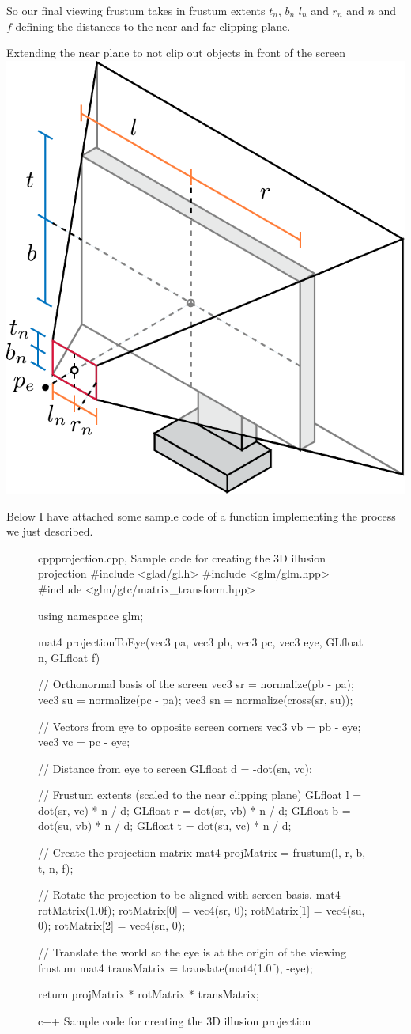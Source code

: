 So our final viewing frustum takes in frustum extents $t_n$, $b_n$ $l_n$ and $r_n$ and $n$ and $f$ defining the distances to the near and far clipping plane.
\begin{figureBox}[label={fig:extending-near}]{Extending the near plane to not clip out objects in front of the screen}
\centering
\includegraphics[width = 0.5\linewidth]{./figures/background/projection/extending-near.pdf}
\end{figureBox}


Below I have attached some sample code of a function implementing the process we just described.
\begin{figure}[H]
\begin{codeBox}{cpp}{projection.cpp, Sample code for creating the 3D illusion projection}
#include <glad/gl.h>
#include <glm/glm.hpp>
#include <glm/gtc/matrix_transform.hpp>

using namespace glm;

mat4 projectionToEye(vec3 pa, vec3 pb, vec3 pc, vec3 eye, GLfloat n, GLfloat f)
{
    // Orthonormal basis of the screen
    vec3 sr = normalize(pb - pa);
    vec3 su = normalize(pc - pa);
    vec3 sn = normalize(cross(sr, su));

    // Vectors from eye to opposite screen corners
    vec3 vb = pb - eye;
    vec3 vc = pc - eye;

    // Distance from eye to screen
    GLfloat d = -dot(sn, vc);

    // Frustum extents (scaled to the near clipping plane)
    GLfloat l = dot(sr, vc) * n / d;
    GLfloat r = dot(sr, vb) * n / d;
    GLfloat b = dot(su, vb) * n / d;
    GLfloat t = dot(su, vc) * n / d;

    // Create the projection matrix
    mat4 projMatrix = frustum(l, r, b, t, n, f);

    // Rotate the projection to be aligned with screen basis.
    mat4 rotMatrix(1.0f);
    rotMatrix[0] = vec4(sr, 0);
    rotMatrix[1] = vec4(su, 0);
    rotMatrix[2] = vec4(sn, 0);

    // Translate the world so the eye is at the origin of the viewing frustum
    mat4 transMatrix = translate(mat4(1.0f), -eye);

    return projMatrix * rotMatrix * transMatrix;
}
\end{codeBox}
\caption{c++ Sample code for creating the 3D illusion projection}
\label{fig:proj-code}
\end{figure}